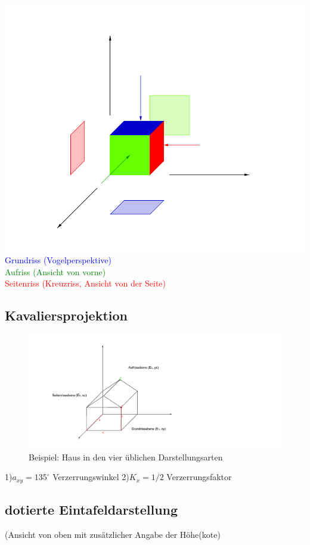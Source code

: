 \documentclass[12pt,a4paper]{scrbook}
\begin{document}
\includegraphics[scale=1]{img/einfuehrung.pdf}\\
\textcolor{blue}{Grundriss (Vogelperspektive)}\\
\textcolor{green}{Aufriss (Ansicht von vorne)}\\
\textcolor{red}{Seitenriss (Kreuzriss, Ansicht von der Seite)}

\subsection{Kavaliersprojektion}
\begin{figure}[h]
  \includegraphics[scale=1.4]{img/DGeinfuehrung_2.pdf}
  \caption{Beispiel: Haus in den vier üblichen Darstellungsarten}
\end{figure}

1)$a_{xy} = 135^{\circ}$ Verzerrungswinkel
2)$K_{x} = 1/2$ Verzerrungsfaktor

\subsection{dotierte Eintafeldarstellung}
(Ansicht von oben mit zusätzlicher Angabe der Höhe(kote)
\begin{figure}

\end{figure}
\end{document}
